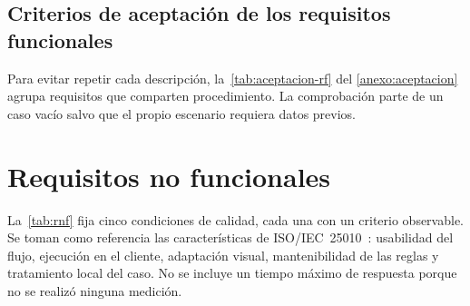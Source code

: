 \subsection{Criterios de aceptación de los requisitos funcionales}

Para evitar repetir cada descripción, la~\cref{tab:aceptacion-rf} del
\cref{anexo:aceptacion} agrupa requisitos que comparten procedimiento. La
comprobación parte de un caso vacío salvo que el propio escenario requiera
datos previos.

\section{Requisitos no funcionales}
\label{sec:rnf}

La~\cref{tab:rnf} fija cinco condiciones de calidad, cada una con un
criterio observable. Se toman como referencia las características de
ISO/IEC~25010~\cite{iso25010}: usabilidad del flujo, ejecución en el
cliente, adaptación visual, mantenibilidad de las reglas y tratamiento
local del caso. No se incluye un tiempo máximo de respuesta porque no se
realizó ninguna medición.

